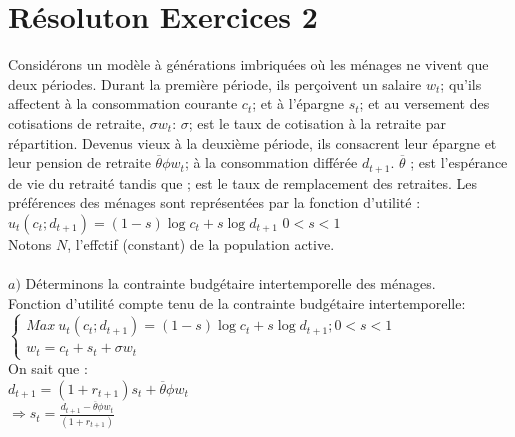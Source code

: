 \documentclass[11pt,twoside,a4paper]{article}
\begin{document}
  \section*{Résoluton Exercices 2}
  
  Considérons un modèle à générations imbriquées où les ménages ne vivent que deux périodes. Durant la première période, ils perçoivent un salaire $w_t$; qu'ils affectent à la  consommation courante $c_t$; et à l'épargne $s_t$; et au versement des cotisations de retraite, $\sigma w_t$: $\sigma$; est le taux de cotisation à la retraite par répartition. Devenus vieux à la deuxième période, ils consacrent leur épargne et leur pension de retraite $\overline{\theta}\phi w_t$; à la consommation différée $d_{t+1}$.
$\overline{\theta}$ ; est l'espérance de vie du retraité tandis que ; est le taux de remplacement
des retraites. Les préférences des ménages sont représentées par la fonction d'utilité :\\
$u_t(c_t; d_{t+1})=(1-s)\log{c_t} + s\log{d_{t+1}}$ \: $0<s<1$
\\
Notons $N$, l'effctif (constant) de la population active.\\\\
$a)$ Déterminons la contrainte budgétaire intertemporelle des ménages.\\

Fonction d'utilité compte tenu de la contrainte budgétaire intertemporelle:\\

$ \left\{\begin{array}{rl}
 Max \ u_t(c_t; d_{t+1})=  (1-s)\log{c_t} + s\log{d_{t+1}} ; 0<s<1 \\
 
w_t  =  c_t + s_t +  \sigma w_t \end{array}\right. $  \\

On sait que :\\

$d_{t+1}=(1+r_{t+1})s_t+\overline{\theta}\phi w_t$\\

  $
\Rightarrow s_t=\frac{d_{t+1}-\overline{\theta}\phi w_t}{(1+r_{t+1})}$\\

 
\end{document}
